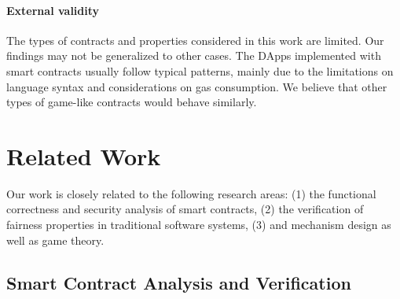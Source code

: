 \paragraph{External validity}
The types of contracts and properties considered in this work are limited.
Our findings may not be generalized to other cases.
The DApps implemented with smart contracts usually follow typical patterns, mainly due
to the limitations on language syntax and considerations on gas consumption.
We believe that other types of game-like contracts would behave similarly.
\section{Related Work}\label{Sec_RelatedWorks}

Our work is closely related to the following research areas:
(1) the functional correctness and security analysis of smart contracts,
(2) the verification of fairness properties in traditional software systems,
(3) and mechanism design as well as game theory.


\subsection{Smart Contract Analysis and Verification}\label{subsec:AnalysisVerification}

